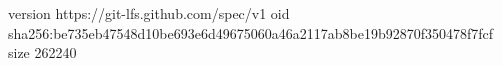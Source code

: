 version https://git-lfs.github.com/spec/v1
oid sha256:be735eb47548d10be693e6d49675060a46a2117ab8be19b92870f350478f7fcf
size 262240
